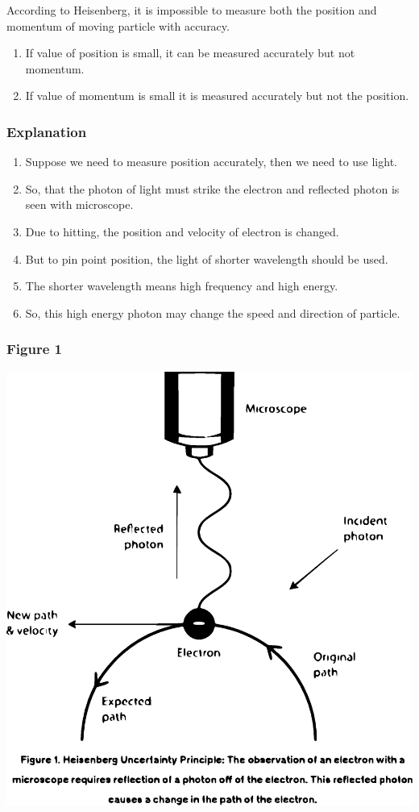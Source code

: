 According to Heisenberg, it is impossible to measure both the position and momentum of moving particle with accuracy.
 \begin{enumerate}
     \item If value of position is small, it can be measured accurately but not momentum.
     \item If value of momentum is small it is measured accurately but not the position.
 \end{enumerate}
 
 

\subsubsection{Explanation}

\begin{enumerate}
    \item Suppose we need to measure position accurately, then we need to use light.
    \item So, that the photon of light must strike the electron and reflected photon is seen with microscope.
    \item Due to hitting, the position and velocity of electron is changed.
    \item But to pin point position, the light of shorter wavelength should be used.
    \item The shorter wavelength means high frequency and high energy.
    \item So, this high energy photon may change the speed and direction of particle.
\end{enumerate}

\subsubsection{Figure 1}

\includegraphics[scale=0.5]{Capture.eps}


